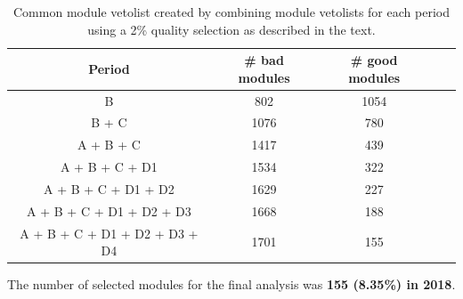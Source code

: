 \begin{table}[h]
\caption{Common module vetolist created by combining module vetolists for each period using a 2\% quality selection as described in the text.}
    \label{tab:2commonveto}
  \begin{center}
    \begin{tabular}{ccccc}  
    \textbf{Period}   & \textbf{\# bad modules} & \textbf{\# good modules} \\  \hline
     B      &  802   &  1054    \\ 
     B + C      &  1076   &  780    \\ 
     A + B + C      &  1417   &  439    \\  
     A + B + C + D1      &   1534  &   322    \\ 
     A + B + C + D1 + D2      &   1629 &    227   \\ 
     A + B + C + D1 + D2 + D3     &   1668 &   188    \\ 
     A + B + C + D1 + D2 + D3 + D4     &  1701 &     155  \\ 
   \end{tabular}
  \end{center}
\end{table}


The number of selected modules for the final analysis was \textbf{155 (8.35\%) in 2018}. 

